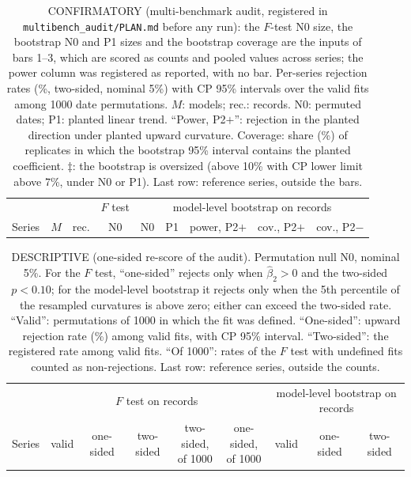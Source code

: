 \documentclass[aps,pre,twocolumn,superscriptaddress,nofootinbib,9pt]{revtex4-2}
\begin{document}
\begin{table}[tbp]
\squeezetable\tiny\renewcommand{\arraystretch}{0.80}
\caption{CONFIRMATORY (multi-benchmark audit, registered in \texttt{multibench\_audit/PLAN.md} before any run): the $F$-test N0 size, the bootstrap N0 and P1 sizes and the bootstrap coverage are the inputs of bars 1--3, which are scored as counts and pooled values across series; the power column was registered as reported, with no bar. Per-series rejection rates (\%, two-sided, nominal 5\%) with CP 95\% intervals over the valid fits among 1000 date permutations. $M$: models; rec.: records. N0: permuted dates; P1: planted linear trend. ``Power, P2$+$'': rejection in the planted direction under planted upward curvature. Coverage: share (\%) of replicates in which the bootstrap 95\% interval contains the planted coefficient. $\ddagger$: the bootstrap is oversized (above 10\% with CP lower limit above 7\%, under N0 or P1). Last row: reference series, outside the bars.}
\label{tab:mbaudit}
\begin{ruledtabular}
\begin{tabular}{lcccccccc}
 & & & $F$ test & \multicolumn{5}{c}{model-level bootstrap on records} \\
Series & $M$ & rec. & N0 & N0 & P1 & power, P2$+$ & cov., P2$+$ & cov., P2$-$ \\
\hline

\end{tabular}
\end{ruledtabular}
\end{table}

\begin{table}[tbp]
\squeezetable\tiny\renewcommand{\arraystretch}{0.80}
\caption{DESCRIPTIVE (one-sided re-score of the audit). Permutation null N0, nominal 5\%. For the $F$ test, ``one-sided'' rejects only when $\hat\beta_2>0$ and the two-sided $p<0.10$; for the model-level bootstrap it rejects only when the 5th percentile of the resampled curvatures is above zero; either can exceed the two-sided rate. ``Valid'': permutations of 1000 in which the fit was defined. ``One-sided'': upward rejection rate (\%) among valid fits, with CP 95\% interval. ``Two-sided'': the registered rate among valid fits. ``Of 1000'': rates of the $F$ test with undefined fits counted as non-rejections. Last row: reference series, outside the counts.}
\label{tab:mbonesided}
\begin{ruledtabular}
\begin{tabular}{lcccccccc}
 & \multicolumn{5}{c}{$F$ test on records} & \multicolumn{3}{c}{model-level bootstrap on records} \\
Series & valid & one-sided & two-sided & \shortstack{two-sided,\\of 1000} & \shortstack{one-sided,\\of 1000} & valid & one-sided & two-sided \\
\hline

\end{tabular}
\end{ruledtabular}
\end{table}
\end{document}
